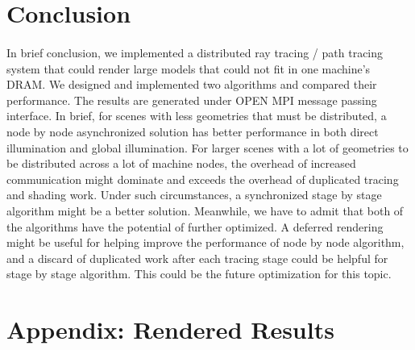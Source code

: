 \documentclass[a4paper, oneside, 10pt]{article}
\begin{document}
\section{Conclusion}
\paragraph{} In brief conclusion, we implemented a distributed ray tracing / path tracing system that could render large models that could not fit in one machine's DRAM. We designed and implemented two algorithms and compared their performance. The results are generated under OPEN MPI message passing interface. In brief, for scenes with less geometries that must be distributed, a node by node asynchronized solution has better performance in both direct illumination and global illumination. For larger scenes with a lot of geometries to be distributed across a lot of machine nodes, the overhead of increased communication might dominate and exceeds the overhead of duplicated tracing and shading work.  Under such circumstances, a synchronized stage by stage algorithm might be a better solution. Meanwhile, we have to admit that both of the algorithms have the potential of further optimized. A deferred rendering might be useful for helping improve the performance of node by node algorithm, and a discard of duplicated work after each tracing stage could be helpful for stage by stage algorithm. This could be the future optimization for this topic.
\section{Appendix: Rendered Results}
\end{document}

